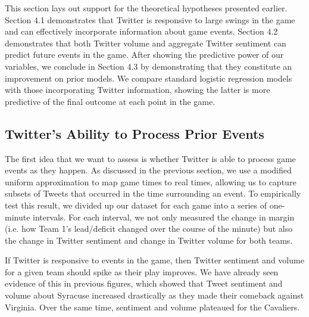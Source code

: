 \documentclass[12pt]{article}
\begin{document}
\begin{doublespacing}
This section lays out support for the theoretical hypotheses presented earlier. Section 4.1 demonstrates that Twitter is responsive to large swings in the game and can effectively incorporate information about game events. Section 4.2 demonstrates that both Twitter volume and aggregate Twitter sentiment can predict future events in the game. After showing the predictive power of our variables, we conclude in Section 4.3 by demonstrating that they constitute an improvement on prior models. We compare standard logistic regression models with those incorporating Twitter information, showing the latter is more predictive of the final outcome at each point in the game. 

\subsection{Twitter's Ability to Process Prior Events}

The first idea that we want to assess is whether Twitter is able to process game events as they happen. As discussed in the previous section, we use a modified uniform approximation to map game times to real times, allowing us to capture subsets of Tweets that occurred in the time surrounding an event. To empirically test this result, we divided up our dataset for each game into a series of one-minute intervals. For each interval, we not only measured the change in margin (i.e. how Team 1's lead/deficit changed over the course of the minute) but also the change in Twitter sentiment and change in Twitter volume for both teams. 

If Twitter is responsive to events in the game, then Twitter sentiment and volume for a given team should spike as their play improves. We have already seen evidence of this in previous figures, which showed that Tweet sentiment and volume about Syracuse increased drastically as they made their comeback against Virginia. Over the same time, sentiment and volume plateaued for the Cavaliers. 


\end{doublespacing}
\end{document}
